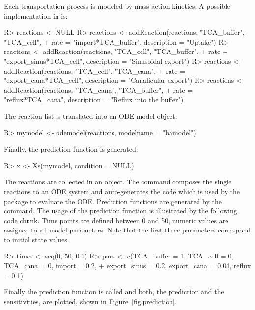\documentclass[article]{jss}
\begin{document}
Each transportation process is modeled by mass-action kinetics. A possible implementation in  is:
\begin{CodeChunk}
\begin{CodeInput}
R> reactions <- NULL
R> reactions <- addReaction(reactions, "TCA_buffer", "TCA_cell",
+    rate = "import*TCA_buffer", description = "Uptake")
R> reactions <- addReaction(reactions, "TCA_cell", "TCA_buffer",
+    rate = "export_sinus*TCA_cell", description = "Sinusoidal export")
R> reactions <- addReaction(reactions, "TCA_cell", "TCA_cana",
+    rate = "export_cana*TCA_cell", description = "Canalicular export")
R> reactions <- addReaction(reactions, "TCA_cana", "TCA_buffer",
+   rate = "reflux*TCA_cana", description = "Reflux into the buffer")
\end{CodeInput}
\end{CodeChunk}
The reaction list is translated into an ODE model object:
\begin{CodeChunk}
\begin{CodeInput}
R> mymodel <- odemodel(reactions, modelname = "bamodel")
\end{CodeInput}
\end{CodeChunk}
Finally, the prediction function is generated:
\begin{CodeChunk}
\begin{CodeInput}
R> x <- Xs(mymodel, condition = NULL)
\end{CodeInput}
\end{CodeChunk}
The reactions are collected in an  object. The  command composes the single reactions to an ODE system and auto-generates the  code which is used by the  package to evaluate the ODE. Prediction functions are generated by the  command. The usage of the prediction function is illustrated by the following code chunk. Time points are defined between 0 and 50, numeric values are assigned to all model parameters. Note that the first three parameters correspond to initial state values.
\begin{CodeChunk}
\begin{CodeInput}
R> times <- seq(0, 50, 0.1)
R> pars <- c(TCA_buffer = 1, TCA_cell = 0, TCA_cana = 0, import = 0.2,
+    export_sinus = 0.2, export_cana = 0.04, reflux = 0.1)
\end{CodeInput}
\end{CodeChunk}
Finally the prediction function is called and both, the prediction and the sensitivities, are plotted, shown in Figure~\ref{fig:prediction}.
\end{document}
